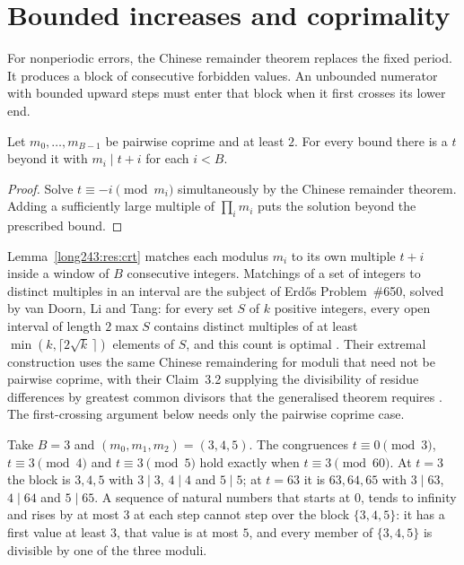 \documentclass[11pt]{article}
\begin{document}
\section{Bounded increases and coprimality}\label{long243:sec:barrier}

For nonperiodic errors, the Chinese remainder theorem replaces the
fixed period. It produces a block of consecutive forbidden values.
An unbounded numerator with bounded upward steps must enter that
block when it first crosses its lower end.

\begin{lemma}\label{long243:res:crt}
Let $m_0,\ldots,m_{B-1}$ be pairwise coprime and at least $2$.  For every bound
there is a $t$ beyond it with $m_i\mid t+i$ for each $i<B$.
\end{lemma}

\begin{proof}
Solve $t\equiv-i\pmod{m_i}$ simultaneously by the Chinese
remainder theorem. Adding a sufficiently large multiple of
$\prod_i m_i$ puts the solution beyond the prescribed bound.
\end{proof}



\noindent Lemma~\ref{long243:res:crt} matches each modulus $m_i$ to its own
multiple $t+i$ inside a window of $B$ consecutive integers. Matchings of a set
of integers to distinct multiples in an interval are the subject of
Erd\H{o}s Problem~\#650, solved by van Doorn, Li and Tang: for every set $S$
of $k$ positive integers, every open interval of length $2\max S$ contains
distinct multiples of at least $\min(k,\lceil 2\sqrt{k}\,\rceil)$ elements of
$S$, and this count is optimal \cite[Theorem~2.1]{vandoornlitang2026}. Their
extremal construction uses the same Chinese remaindering for moduli that need
not be pairwise coprime, with their Claim~3.2 supplying the divisibility of
residue differences by greatest common divisors that the generalised theorem
requires \cite[pp.~4--5]{vandoornlitang2026}. The first-crossing argument
below needs only the pairwise coprime case.

\begin{example}\label{long243:ex:crt}
Take $B=3$ and $(m_0,m_1,m_2)=(3,4,5)$.  The congruences $t\equiv0\pmod3$,
$t\equiv3\pmod4$ and $t\equiv3\pmod5$ hold exactly when $t\equiv3\pmod{60}$.
At $t=3$ the block is $3,4,5$ with $3\mid3$, $4\mid4$ and $5\mid5$; at $t=63$
it is $63,64,65$ with $3\mid63$, $4\mid64$ and $5\mid65$.  A sequence of
natural numbers that starts at $0$, tends to infinity and rises by at most $3$
at each step cannot step over the block $\{3,4,5\}$: it has a first value at
least $3$, that value is at most $5$, and every member of $\{3,4,5\}$ is
divisible by one of the three moduli.
\end{example}
\end{document}
